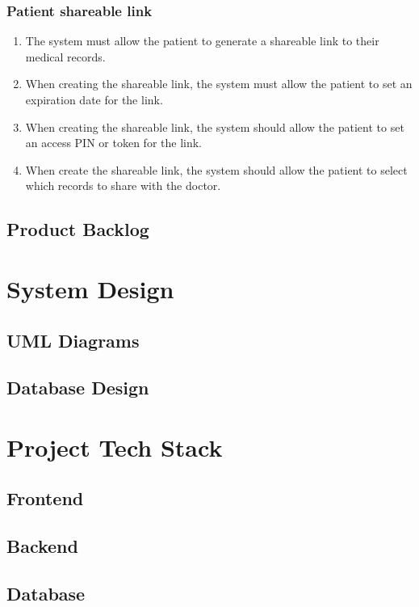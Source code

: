 \subsubsection{Patient shareable link}
\begin{enumerate}
    \item The system must allow the patient to generate a shareable link to their medical records.
    \item When creating the shareable link, the system must allow the patient to set an expiration date for the link.
    \item When creating the shareable link, the system should allow the patient to set an access PIN or token for the link.
    \item When create the shareable link, the system should allow the patient to select which records to share with the doctor.
\end{enumerate}

\subsection{Product Backlog}

\section{System Design}

\subsection{UML Diagrams}

\subsection{Database Design}

\section{Project Tech Stack}

\subsection{Frontend}

\subsection{Backend}

\subsection{Database}